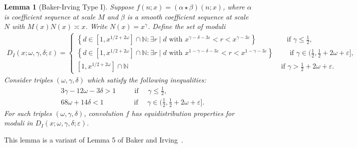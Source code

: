 \documentclass{amsart}
\newtheorem{lemma}{Lemma}
\numberwithin{equation}{section}
\begin{document}
  
\begin{lemma}[Baker-Irving Type I] \label{lem:typeIBI} 
Suppose $f(n;x) = (\alpha \star \beta)(n;x)$, where $\alpha$ is  coefficient sequence at scale $M$ and $\beta$ is a smooth coefficient sequence at scale $N$ with $M(x) N(x) \asymp x$. Write $N(x) = x^\gamma$. Define the set of moduli
\begin{align*}
D_I(x;\omega,\gamma,\delta;\varepsilon) =
\begin{cases}
 \left\{d \in  [1, x^{1/2+2\omega}]\cap \mathbb{N}:  \exists r \mid d \mbox{ with } x^{\gamma-\delta -3\varepsilon} < r < x^{\gamma - 3\varepsilon} \right\} \qquad \qquad \mbox{ if } \gamma \leq \frac{1}{2}, \\
  \left\{d \in  [1, x^{1/2+2\omega}]\cap \mathbb{N}:  \exists r \mid d \mbox{ with } x^{1-\gamma-\delta -3\varepsilon} < r < x^{1-\gamma - 3\varepsilon} \right\} \qquad \mbox{ if } \gamma \in (\frac{1}{2},\frac{1}{2}+2\omega+\varepsilon], \\
  [1, x^{1/2+2\omega}]\cap \mathbb{N}  \qquad\qquad\qquad\qquad\qquad\qquad\qquad\qquad\qquad\quad \qquad \,\,\, \mbox{ if } \gamma >\frac{1}{2}+2\omega+\varepsilon.
 \end{cases}
\end{align*}
Consider triples $(\omega,\gamma,\delta)$ which satisfy the following inequalities: 
\begin{align*}
&3\gamma-12\omega  -3\delta >1    \qquad  \,\, \mbox{ if }  \quad \gamma \leq \tfrac{1}{2}, \\
&68\omega + 14 \delta    <1  \qquad \qquad\mbox{ if } \quad   \gamma \in (\tfrac{1}{2},\tfrac{1}{2}+2\omega+\varepsilon].
\end{align*}
For such triples  $(\omega,\gamma,\delta)$, convolution $f$ has equidistribution properties for moduli in $D_I(x;\omega,\gamma,\delta;\varepsilon)$.
\end{lemma}

This lemma is a variant  of Lemma 5 of Baker and Irving~\cite{Baker:2017:BIP}. 
\end{document}

